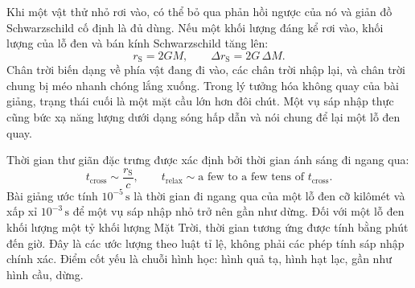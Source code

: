 Khi một vật thử nhỏ rơi vào, có thể bỏ qua phản hồi ngược của nó và giản đồ Schwarzschild cố định là đủ dùng. Nếu một khối lượng đáng kể rơi vào, khối lượng của lỗ đen và bán kính Schwarzschild tăng lên:
\begin{equation}
r_{\mathrm S}=2GM,
\qquad
\Delta r_{\mathrm S}=2G\,\Delta M.
\label{eq:l7-growing-radius}
\end{equation}
Chân trời biến dạng về phía vật đang đi vào, các chân trời nhập lại, và chân trời chung bị méo nhanh chóng lắng xuống. Trong lý tưởng hóa không quay của bài giảng, trạng thái cuối là một mặt cầu lớn hơn đôi chút. Một vụ sáp nhập thực cũng bức xạ năng lượng dưới dạng sóng hấp dẫn và nói chung để lại một lỗ đen quay.

\begin{classroomqa}
\end{classroomqa}

\begin{classroomqa}
\end{classroomqa}

Thời gian thư giãn đặc trưng được xác định bởi thời gian ánh sáng đi ngang qua:
\begin{equation}
t_{\mathrm{cross}}\sim\frac{r_{\mathrm S}}{c},
\qquad
t_{\mathrm{relax}}\sim
\text{a few to a few tens of }t_{\mathrm{cross}}.
\label{eq:l7-relaxation-scale}
\end{equation}
Bài giảng ước tính \(10^{-5}\,\mathrm{s}\) là thời gian đi ngang qua của một lỗ đen cỡ kilômét và xấp xỉ \(10^{-3}\,\mathrm{s}\) để một vụ sáp nhập nhỏ trở nên gần như dừng. Đối với một lỗ đen khối lượng một tỷ khối lượng Mặt Trời, thời gian tương ứng được tính bằng phút đến giờ. Đây là các ước lượng theo luật tỉ lệ, không phải các phép tính sáp nhập chính xác. Điểm cốt yếu là chuỗi hình học: hình quả tạ, hình hạt lạc, gần như hình cầu, dừng.

